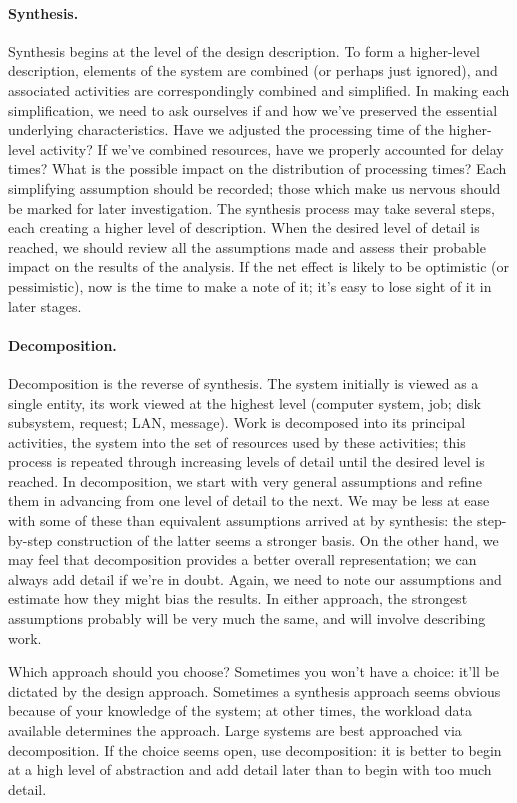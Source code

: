 \paragraph{Synthesis.}
Synthesis begins at the level of the design description. To form a higher-level
description, elements of the system are combined (or perhaps just ignored),
and associated activities are correspondingly combined and simplified. In
making each simplification, we need to ask ourselves if and how we've
preserved the essential underlying characteristics. Have we adjusted the
processing time of the higher-level activity? If we've combined resources,
have we properly accounted for delay times? What is the possible impact on
the distribution of processing times? Each simplifying assumption should be
recorded; those which make us nervous should be marked for later
investigation. The synthesis process may take several steps, each creating a
higher level of description. When the desired level of detail is reached, we
should review all the assumptions made and assess their probable impact on
the results of the analysis. If the net effect is likely to be optimistic (or
pessimistic), now is the time to make a note of it; it's easy to lose sight of
it in later stages.

\paragraph{Decomposition.}
Decomposition is the reverse of synthesis. The system initially is viewed as a
single entity, its work viewed at the highest level (computer system, job; disk
subsystem, request; LAN, message). Work is decomposed into its principal
activities, the system into the set of resources used by these activities; this
process is repeated through increasing levels of detail until the desired level
is reached. In decomposition, we start with very general assumptions and
refine them in advancing from one level of detail to the next. We may be less
at ease with some of these than equivalent assumptions arrived at by
synthesis: the step-by-step construction of the latter seems a stronger basis.
On the other hand, we may feel that decomposition provides a better overall
representation; we can always add detail if we're in doubt. Again, we need to
note our assumptions and estimate how they might bias the results. In either
approach, the strongest assumptions probably will be very much the same, and
will involve describing work.

Which approach should you choose? Sometimes you won't have a choice: it'll be
dictated by the design approach. Sometimes a synthesis approach seems obvious
because of your knowledge of the system; at other times, the workload data
available determines the approach. Large systems are best approached via
decomposition. If the choice seems open, use decomposition: it is better to
begin at a high level of abstraction and add detail later than to begin with
too much detail.

